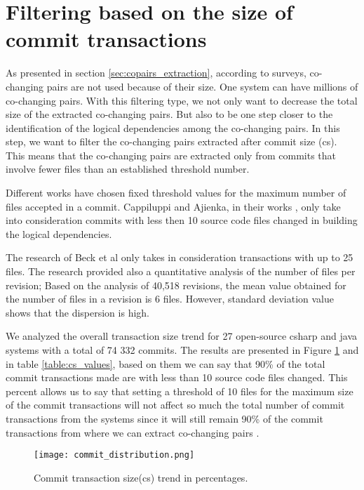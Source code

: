 \section{Filtering based on the size of commit transactions}
\label{sec:filtercommit}

As presented in section \ref{sec:copairs_extraction}, according to surveys,  co-changing pairs are not used because of their size. One system can have millions of co-changing pairs.
With this filtering type, we not only want to decrease the total size of the extracted co-changing pairs. But also to be one step closer to the identification of the logical dependencies among the co-changing pairs.
In this step, we want to filter the co-changing pairs extracted after commit size (cs). This means that the co-changing pairs are extracted only from commits that involve fewer files than an established threshold number. 

Different works have chosen fixed threshold values for the maximum number of files accepted in a commit. Cappiluppi and Ajienka, in their works \cite{DBLP:journals/jss/AjienkaC17}, \cite{DBLP:journals/ese/AjienkaCC18} only take into consideration commits with less then 10 source code files changed in building the logical dependencies.

The research of Beck et al \cite{Beck:2011:CMC:2025113.2025162} only takes in consideration transactions with up to 25 files. The research \cite{Oliva:2011:ISL:2067853.2068086} provided also a quantitative analysis of the number of files per revision; Based on the analysis of 40,518 revisions, the mean value obtained for the number of files in a revision is 6 files. However, standard deviation value shows that the dispersion is high. 

We analyzed the overall transaction size trend for 27 open-source csharp and java systems with a total of 74 332 commits. The results are presented in Figure \ref{fig:fig_cs} and in table \ref{table:cs_values}, based on them we can say that 90\% of the total commit transactions made are with less than 10 source code files changed. This percent allows us to say that setting a threshold of 10 files for the maximum size of the commit transactions will not affect so much the total number of commit transactions from the systems since it will still remain 90\% of the commit transactions from where we can extract co-changing pairs \cite{DepSACI}.


\begin{figure}[!h]
\centering
\texttt{[image: commit\_distribution.png]}
\caption{Commit transaction size(cs) trend in percentages.}
\label{fig:fig_cs}
\centering
\end{figure}


